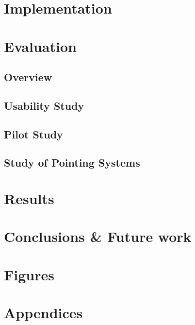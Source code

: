 \documentclass[a4paper, 12pt]{report}
\begin{document}
\chapter{Implementation}

\chapter{Evaluation}
\section{Overview}
\section{Usability Study}
\section{Pilot Study}
\section{Study of Pointing Systems}

\chapter{Results}

\chapter{Conclusions \& Future work}

\chapter{Figures}
\pagebreak
\printglossary[title=Terms]

\pagebreak
\printbibliography

\pagebreak
\chapter{Appendices}
\end{document}
